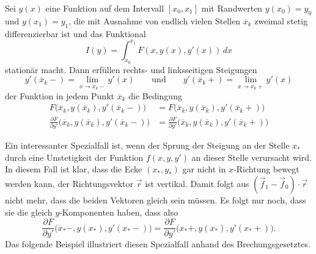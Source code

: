 \begin{satz}
Sei $y(x)$ eine Funktion auf dem Intervall $[x_0,x_1]$ mit Randwerten
$y(x_0)=y_0$ und $y(x_1)=y_1$, die mit Ausnahme von endlich
vielen Stellen $\overline{x}_k$ zweimal
stetig differenzierbar ist und das Funktional
\[
I(y)
=
\int_{x_0}^{x_1}
F(x,y(x),y'(x))
\,dx
\]
stationär macht.
Dann erfüllen rechts- und linksseitigen Steigungen
\[
y'(\overline{x}_k-) = \lim_{x\to \overline{x}_k-} y'(x)
\qquad\text{und}\qquad
y'(\overline{x}_k+) = \lim_{x\to \overline{x}_k+} y'(x)
\]
der Funktion in jedem Punkt $\overline{x}_k$ die Bedingung
\begin{equation}
\begin{aligned}
F\bigl(
\overline{x}_k,
y(\overline{x}_k),
y'(\overline{x}_k-)
\bigr)
&=
F\bigl(
\overline{x}_k,
y(\overline{x}_k),
y'(\overline{x}_k+)
\bigr)
\\
\frac{\partial F}{\partial y'}\bigl(
\overline{x}_k,
y(\overline{x}_k),
y'(\overline{x}_k-)
\bigr)
&=
\frac{\partial F}{\partial y'}\bigl(
\overline{x}_k,
y(\overline{x}_k),
y'(\overline{x}_k+)
\bigr)
\end{aligned}
\label{buch:nichtdiff:eckenedingung:eqn:we}
\end{equation}
\end{satz}

Ein interessanter Spezialfall ist, wenn der Sprung der Steigung
an der Stelle $x_*$ durch eine Unstetigkeit der Funktion $f(x,y,y')$
an dieser Stelle verursacht wird.
In diesem Fall ist klar, dass die Ecke $(x_*,y_*)$ gar nicht in
$x$-Richtung bewegt werden kann, der Richtungsvektor $\vec{r}$ ist
vertikal.
Damit folgt aus $(\vec{f}_1-\vec{f}_0)\cdot\vec{r}$ nicht mehr,
dass die beiden Vektoren gleich sein müssen.
Es folgt nur noch, dass sie die gleich $y$-Komponenten haben,
dass also
\begin{equation}
\frac{\partial F}{\partial y'}\bigl(x_*-,y(x_*),y'(x_*-)\bigr)
=
\frac{\partial F}{\partial y'}\bigl(x_*+,y(x_*),y'(x_*+)\bigr).
\label{buch:nichtdiff:eckenbedingung:eqn:we0}
\end{equation}
Das folgende Beispiel illustriert diesen Spezialfall anhand des
Brechungsgesetztes.

